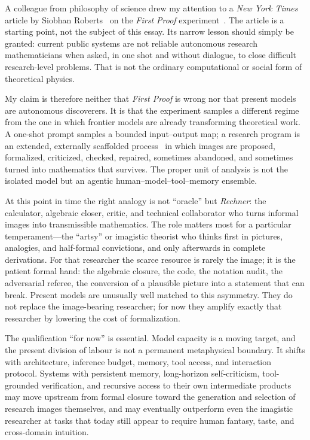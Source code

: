 \documentclass[
  aps,
  reprint,
  superscriptaddress,
  floatfix,
  nofootinbib,
  longbibliography
]{revtex4-2}
\begin{document}
A colleague from philosophy of science drew my attention to a \textit{New York
Times} article by Siobhan Roberts~\cite{roberts2026} on the \textit{First Proof}
experiment~\cite{firstproof}. The article is a starting point, not the subject of
this essay. Its narrow lesson should simply be granted: current public systems
are not reliable autonomous research mathematicians when asked, in one shot and
without dialogue, to close difficult research-level problems. That is not the
ordinary computational or social form of theoretical physics.

My claim is therefore neither that \textit{First Proof} is wrong nor that present
models are autonomous discoverers. It is that the experiment samples a different
regime from the one in which frontier models are already transforming theoretical
work. A one-shot prompt samples a bounded input--output map; a research program
is an extended, externally scaffolded process~\cite{lakatosch} in which images
are proposed, formalized, criticized, checked, repaired, sometimes abandoned, and
sometimes turned into mathematics that survives. The proper unit of analysis is
not the isolated model but an agentic human--model--tool--memory ensemble.

At this point in time the right analogy is not ``oracle'' but \emph{Rechner}: the calculator,
algebraic closer, critic, and technical collaborator who turns informal images
into transmissible mathematics. The role matters most for a particular
temperament---the ``artsy'' or imagistic theorist who thinks first in pictures,
analogies, and half-formal convictions, and only afterwards in complete
derivations. For that researcher the scarce resource is rarely the image; it is
the patient formal hand: the algebraic closure, the code, the notation audit, the
adversarial referee, the conversion of a plausible picture into a statement that
can break. Present models are unusually well matched to this asymmetry. They do
not replace the image-bearing researcher; for now they amplify exactly that
researcher by lowering the cost of formalization.

The qualification ``for now'' is essential. Model capacity is a moving target,
and the present division of labour is not a permanent metaphysical boundary. It
shifts with architecture, inference budget, memory, tool access, and interaction
protocol. Systems with persistent memory, long-horizon self-criticism,
tool-grounded verification, and recursive access to their own intermediate
products may move upstream from formal closure toward the generation and
selection of research images themselves, and may eventually outperform even the
imagistic researcher at tasks that today still appear to require human fantasy,
taste, and cross-domain intuition.
\end{document}

